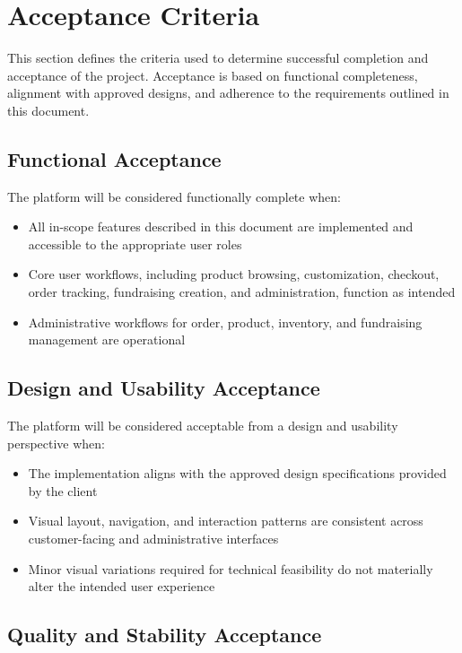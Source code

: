 \section{Acceptance Criteria}

This section defines the criteria used to determine successful completion and
acceptance of the project. Acceptance is based on functional completeness,
alignment with approved designs, and adherence to the requirements outlined in
this document.

\subsection{Functional Acceptance}

The platform will be considered functionally complete when:
\begin{itemize}[leftmargin=1.5em]
    \item All in-scope features described in this document are implemented
    and accessible to the appropriate user roles
    \item Core user workflows, including product browsing, customization,
    checkout, order tracking, fundraising creation, and administration, function
    as intended
    \item Administrative workflows for order, product, inventory, and fundraising
    management are operational
\end{itemize}

\subsection{Design and Usability Acceptance}

The platform will be considered acceptable from a design and usability
perspective when:
\begin{itemize}[leftmargin=1.5em]
    \item The implementation aligns with the approved design specifications
    provided by the client
    \item Visual layout, navigation, and interaction patterns are consistent
    across customer-facing and administrative interfaces
    \item Minor visual variations required for technical feasibility do not
    materially alter the intended user experience
\end{itemize}

\subsection{Quality and Stability Acceptance}

